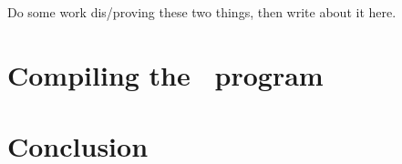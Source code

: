 Do some work dis/proving these two things, then write about it here.


\section{Compiling the \derp\ program}

\section{Conclusion}

% 

% 
% 
% 
% 
% 


